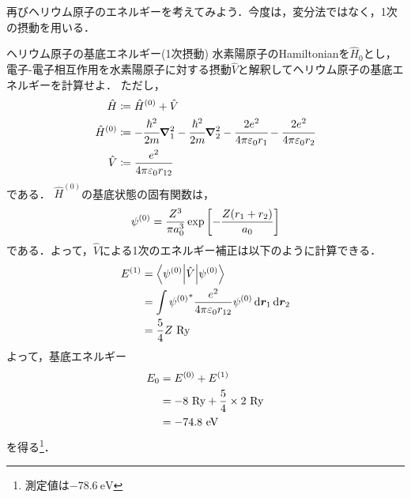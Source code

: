 \documentclass{report}
\begin{document}
  再びヘリウム原子のエネルギーを考えてみよう．今度は，変分法ではなく，1次の摂動を用いる．
  \begin{myex}{ヘリウム原子の基底エネルギー(1次摂動)}{}
    水素陽原子のHamiltonianを$\hat{H}_0$とし，電子-電子相互作用を水素陽原子に対する摂動$\hat{V}$と解釈してヘリウム原子の基底エネルギーを計算せよ．
    ただし，
    \begin{align}
      \hat{H} &\coloneqq \hat{H}^{(0)} + \hat{V} \\ 
      \hat{H}^{(0)} &\coloneqq -\cfrac{\hbar^2}{2m}\grad_{1}^{2} -\cfrac{\hbar^2}{2m}\grad_{2}^{2} - \cfrac{2e^2}{4\pi \varepsilon_0 r_1}-\cfrac{2e^2}{4\pi \varepsilon_0 r_2} \\ 
      \hat{V} &\coloneqq \frac{e^2}{4\pi\varepsilon_0r_{12}} \\ 
    \end{align}
    である．
    \tcblower
    $\hat{H}^{(0)}$の基底状態の固有関数は，
    \begin{align}
      \psi^{(0)} = \frac{Z^3}{\pi a_0^3}\exp\qty[-\frac{Z(r_1+r_2)}{a_0}]
    \end{align}
    である．よって，$\hat{V}$による1次のエネルギー補正は以下のように計算できる．
    \begin{align}
      E^{(1)} &= \mel**{\psi^{(0)}}{\hat{V}}{\psi^{(0)}} \\
      &= \int{\psi^{(0)}}^{*}\frac{e^2}{4\pi\varepsilon_0r_{12}}\psi^{(0)}\dd{\bm{r}_1}\dd{\bm{r}_2} \\
      &= \frac{5}{4}Z\ \mathrm{Ry}
    \end{align}
    よって，基底エネルギー
    \begin{align}
      E_0 &= E^{(0)} + E^{(1)}\\
      &= -8\ \mathrm{Ry} + \frac{5}{4}\times{2}\ \mathrm{Ry}\\
      &= -74.8\ \mathrm{eV}
    \end{align}
    を得る\footnote{測定値は$-78.6\ \mathrm{eV}$}．
  \end{myex}
\end{document}
